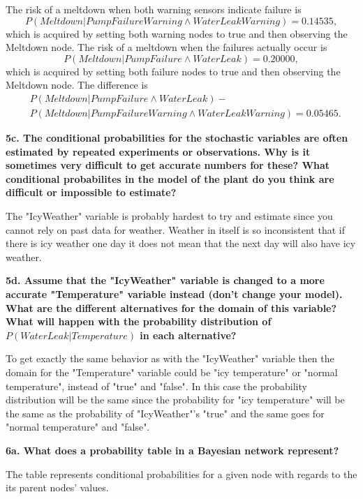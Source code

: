 \documentclass[a4paper,10pt]{article}
\begin{document}
The risk of a meltdown when both warning sensors indicate failure is 
\begin{equation*}
	P(Meltdown | PumpFailureWarning \wedge WaterLeakWarning) = 0.14535,
\end{equation*}
which is acquired by setting both warning nodes to true and then observing the Meltdown node.
The risk of a meltdown when the failures actually occur is 
\begin{equation*}
	P(Meltdown | PumpFailure \wedge WaterLeak) = 0.20000,
\end{equation*}
which is acquired by setting both failure nodes to true and then observing the Meltdown node.
The difference is 
\begin{align*}
	&P(Meltdown | PumpFailure \wedge WaterLeak) - 
	\\
	&P(Meltdown|PumpFailureWarning \wedge WaterLeakWarning) = 0.05465.
\end{align*}

\textbf{5c. The conditional probabilities for the stochastic variables are often estimated by repeated experiments or observations. 
Why is it sometimes very difficult to get accurate numbers for these? 
What conditional probabilites in the model of the plant do you think are difficult or impossible to estimate?}

The "IcyWeather" variable is probably hardest to try and estimate since you cannot rely on past data for weather.
Weather in itself is so inconsistent that if there is icy weather one day it does not mean that the next day will also have icy weather.

\textbf{5d. Assume that the "IcyWeather" variable is changed to a more accurate "Temperature" variable instead (don't change your model). 
What are the different alternatives for the domain of this variable? 
What will happen with the probability distribution of $P(WaterLeak | Temperature)$ in each alternative?}

To get exactly the same behavior as with the "IcyWeather" variable then the domain for the "Temperature" variable could be "icy temperature" or "normal temperature",
instead of "true" and "false".
In this case the probability distribution will be the same since the probability for "icy temperature" will be the same as the probability of "IcyWeather"'s "true" and
the same goes for "normal temperature" and "false".

\textbf{6a. What does a probability table in a Bayesian network represent?}

The table represents conditional probabilities for a given node
with regards to the its parent nodes' values.
\end{document}
